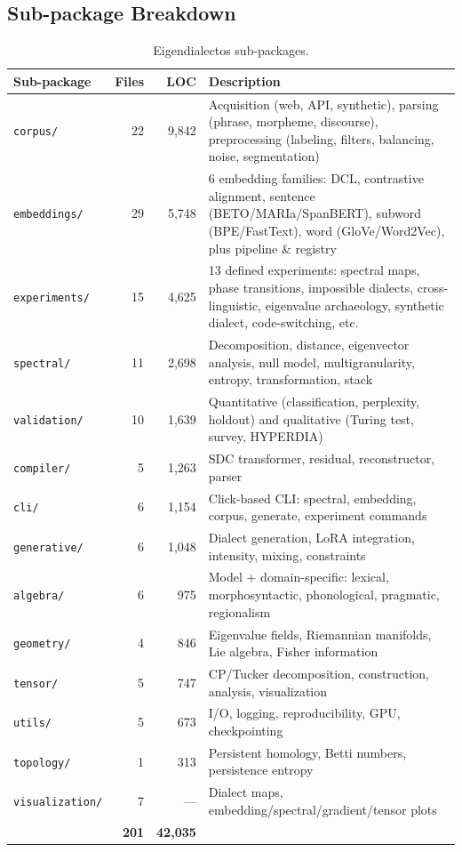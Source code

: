 \documentclass[11pt,a4paper]{article}
\begin{document}
\subsection{Sub-package Breakdown}

\begin{table}[H]
\centering
\caption{Eigendialectos sub-packages.}
\begin{tabular}{@{}lrrp{7cm}@{}}
\toprule
\textbf{Sub-package} & \textbf{Files} & \textbf{LOC} & \textbf{Description} \\
\midrule
\texttt{corpus/} & 22 & 9{,}842 & Acquisition (web, API, synthetic), parsing (phrase, morpheme, discourse), preprocessing (labeling, filters, balancing, noise, segmentation) \\
\texttt{embeddings/} & 29 & 5{,}748 & 6 embedding families: DCL, contrastive alignment, sentence (BETO/MARIa/SpanBERT), subword (BPE/FastText), word (GloVe/Word2Vec), plus pipeline \& registry \\
\texttt{experiments/} & 15 & 4{,}625 & 13 defined experiments: spectral maps, phase transitions, impossible dialects, cross-linguistic, eigenvalue archaeology, synthetic dialect, code-switching, etc. \\
\texttt{spectral/} & 11 & 2{,}698 & Decomposition, distance, eigenvector analysis, null model, multigranularity, entropy, transformation, stack \\
\texttt{validation/} & 10 & 1{,}639 & Quantitative (classification, perplexity, holdout) and qualitative (Turing test, survey, HYPERDIA) \\
\texttt{compiler/} & 5 & 1{,}263 & SDC transformer, residual, reconstructor, parser \\
\texttt{cli/} & 6 & 1{,}154 & Click-based CLI: spectral, embedding, corpus, generate, experiment commands \\
\texttt{generative/} & 6 & 1{,}048 & Dialect generation, LoRA integration, intensity, mixing, constraints \\
\texttt{algebra/} & 6 & 975 & Model + domain-specific: lexical, morphosyntactic, phonological, pragmatic, regionalism \\
\texttt{geometry/} & 4 & 846 & Eigenvalue fields, Riemannian manifolds, Lie algebra, Fisher information \\
\texttt{tensor/} & 5 & 747 & CP/Tucker decomposition, construction, analysis, visualization \\
\texttt{utils/} & 5 & 673 & I/O, logging, reproducibility, GPU, checkpointing \\
\texttt{topology/} & 1 & 313 & Persistent homology, Betti numbers, persistence entropy \\
\texttt{visualization/} & 7 & --- & Dialect maps, embedding/spectral/gradient/tensor plots \\
\midrule
& \textbf{201} & \textbf{42{,}035} & \\
\bottomrule
\end{tabular}
\end{table}
\end{document}
